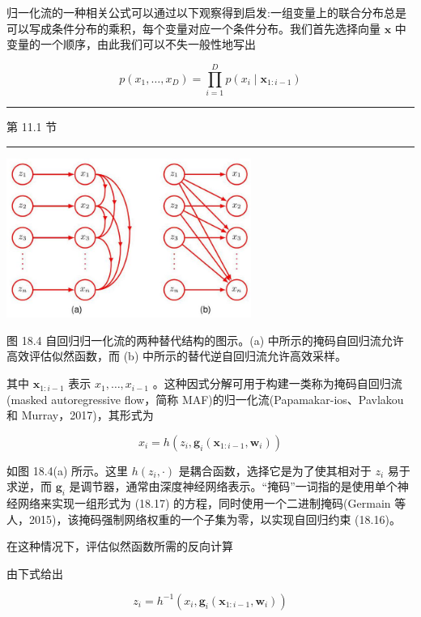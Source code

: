 \documentclass[10pt]{article}
\newcommand{\HRule}{\begin{center}\rule{0.9\linewidth}{0.2mm}\end{center}}
\begin{document}
归一化流的一种相关公式可以通过以下观察得到启发:一组变量上的联合分布总是可以写成条件分布的乘积，每个变量对应一个条件分布。我们首先选择向量 \(\mathbf{x}\) 中变量的一个顺序，由此我们可以不失一般性地写出

\[
p\left( {{x}_{1},\ldots ,{x}_{D}}\right)  = \mathop{\prod }\limits_{{i = 1}}^{D}p\left( {{x}_{i} \mid  {\mathbf{x}}_{1 : i - 1}}\right)  \tag{18.16}
\]

\HRule

第 11.1 节

\HRule

\begin{center}
\includegraphics[max width=0.6\textwidth]{images/0194e279-9b28-703a-88f4-c3ac21e2010d_572_692_342_756_492_0.jpg}
\end{center}
\hspace*{3em} 

图 18.4 自回归归一化流的两种替代结构的图示。(a) 中所示的掩码自回归流允许高效评估似然函数，而 (b) 中所示的替代逆自回归流允许高效采样。

其中 \({\mathbf{x}}_{1 : i - 1}\) 表示 \({x}_{1},\ldots ,{x}_{i - 1}\) 。这种因式分解可用于构建一类称为掩码自回归流(masked autoregressive flow，简称 MAF)的归一化流(Papamakar-ios、Pavlakou 和 Murray，2017)，其形式为

\[
{x}_{i} = h\left( {{z}_{i},{\mathbf{g}}_{i}\left( {{\mathbf{x}}_{1 : i - 1},{\mathbf{w}}_{i}}\right) }\right)  \tag{18.17}
\]

如图 18.4(a) 所示。这里 \(h\left( {{z}_{i}, \cdot  }\right)\) 是耦合函数，选择它是为了使其相对于 \({z}_{i}\) 易于求逆，而 \({\mathbf{g}}_{i}\) 是调节器，通常由深度神经网络表示。“掩码”一词指的是使用单个神经网络来实现一组形式为 (18.17) 的方程，同时使用一个二进制掩码(Germain 等人，2015)，该掩码强制网络权重的一个子集为零，以实现自回归约束 (18.16)。

在这种情况下，评估似然函数所需的反向计算

由下式给出

\[
{z}_{i} = {h}^{-1}\left( {{x}_{i},{\mathbf{g}}_{i}\left( {{\mathbf{x}}_{1 : i - 1},{\mathbf{w}}_{i}}\right) }\right)  \tag{18.18}
\]
\end{document}
